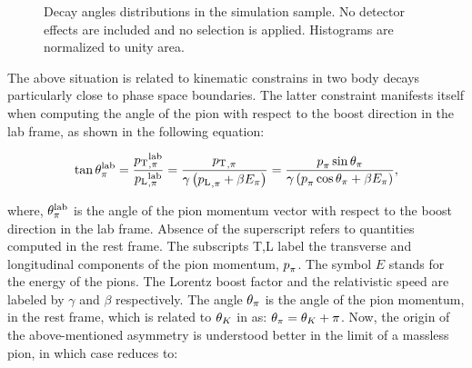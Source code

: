 \begin{figure}[t]
  \centering
  \begin{subfigure}{0.33\textwidth}
    \scalebox{0.65}{}
    \caption{}
    \label{angDistr_ctk}
  \end{subfigure}%
  \hfill%
  \begin{subfigure}{0.33\textwidth}
    \scalebox{0.65}{}
    \caption{}
    \label{angDistr_ctl}
  \end{subfigure}%
  \hfill%
  \begin{subfigure}{0.33\textwidth}
    \scalebox{0.65}{}
    \caption{}
    \label{angDistr_phi}
  \end{subfigure}
  \caption{Decay angles distributions in the simulation sample. No detector effects are included and no selection is applied. 
           Histograms are normalized to unity area.}
  \label{angDistr_all}
\end{figure}

The above situation is related to kinematic constrains in two body decays particularly close to phase
space boundaries. The latter constraint manifests itself when computing the angle of the pion
with respect to the boost direction in the lab frame, as shown in the following equation:

\begin{equation}
  \centering
  \tan\thetapi^\lab = \frac{\ptrans{\pi}^\lab}{\plongd{\pi}^\lab}
               = \frac{\ptrans{\pi}}{\gamma\parenthesis{\plongd{\pi} + \beta E_\pi} }
               = \frac{\ptot_{\pi} \sin\thetapi}{\gamma\parenthesis{\ptot_{\pi} \cos\thetapi + \beta E_\pi} },
  \label{pi_angle}
\end{equation}

\noindent where, $\theta_{\pi}^{\rm lab}$ is the angle of the pion momentum vector with respect to the boost direction
in the lab frame. Absence of the \lab superscript refers to quantities computed in the \Kstarz rest frame.
The subscripts T,L label the transverse and longitudinal components of the pion momentum, $\mbox{$p$}_{\pi}$.
The symbol $E$ stands for the energy of the pions. The Lorentz boost factor and the relativistic speed
are labeled by $\gamma$ and $\beta$ respectively. The angle $\theta_{\pi}$ is the angle of the pion momentum,
in the \Kstarz rest frame, which is related to $\theta_{K}$ in  as: $\theta_{\pi} = \theta_{K} + \pi$.
Now, the origin of the above-mentioned asymmetry is understood better in the limit of a massless pion,
in which case  reduces to:

